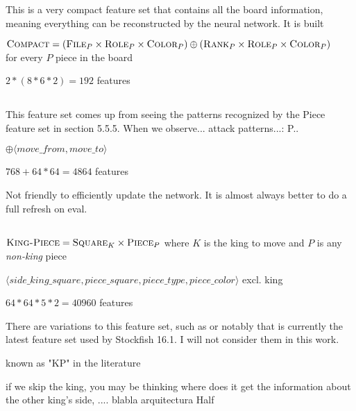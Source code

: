 This is a very compact feature set that contains all the board information, meaning everything can be reconstructed by the neural network. It is built 

\begin{center}
    $\textsc{Compact} = (\textsc{File}_{P} \times \textsc{Role}_{P} \times \textsc{Color}_{P}) \oplus (\textsc{Rank}_{P} \times \textsc{Role}_{P} \times \textsc{Color}_{P})$ \\
    for every $P$ piece in the board
\end{center}

$2*(8*6*2)=192$ features

\subsection{\mdseries{}}

This feature set comes up from seeing the patterns recognized by the Piece feature set in section 5.5.5. When we observe... attack patterns...:
P..

 $\oplus \langle move\_from, move\_to \rangle$

$768 + 64*64=4864$ features

Not friendly to efficiently update the network. It is almost always better to do a full refresh on eval.

\subsection{\mdseries{}}

$\textsc{King-Piece} = \textsc{Square}_{K} \times \textsc{Piece}_{P}$ where $K$ is the king to move and $P$ is any \textit{non-king} piece

$\langle side\_king\_square, piece\_square, piece\_type, piece\_color \rangle$ excl. king

$64*64*5*2=40960$ features

There are variations to this feature set, such as  or notably  that is currently the latest feature set used by Stockfish 16.1. I will not consider them in this work.

known as "KP" in the literature

if we skip the king, you may be thinking where does it get the information about the other king's side, .... blabla arquitectura Half

\subsection{\mdseries{}}


